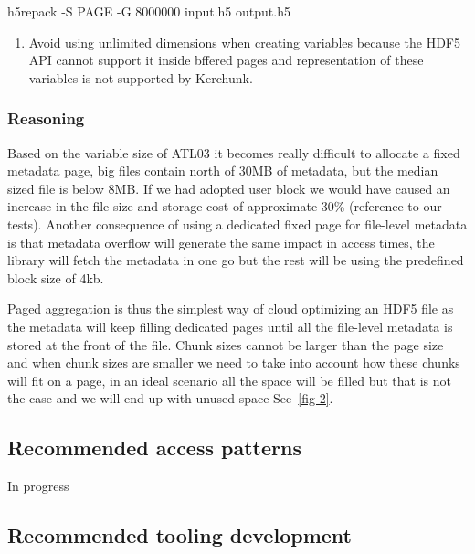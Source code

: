 \documentclass[
]{agujournal2019}
\newenvironment{Shaded}{\begin{snugshade}}{\end{snugshade}}
\newcommand{\AttributeTok}[1]{\textcolor[rgb]{0.40,0.45,0.13}{#1}}
\newcommand{\ExtensionTok}[1]{\textcolor[rgb]{0.00,0.23,0.31}{#1}}
\newcommand{\NormalTok}[1]{\textcolor[rgb]{0.00,0.23,0.31}{#1}}
\providecommand{\tightlist}{%
  \setlength{\itemsep}{0pt}\setlength{\parskip}{0pt}}\usepackage{longtable,booktabs,array}
\begin{document}
\begin{Shaded}
\begin{Highlighting}[]
 \ExtensionTok{h5repack} \AttributeTok{{-}S}\NormalTok{ PAGE }\AttributeTok{{-}G}\NormalTok{ 8000000 input.h5 output.h5}
\end{Highlighting}
\end{Shaded}

\begin{enumerate}
\def\labelenumi{\arabic{enumi}.}
\setcounter{enumi}{2}
\tightlist
\item
  Avoid using unlimited dimensions when creating variables because the
  HDF5 API cannot support it inside bffered pages and representation of
  these variables is not supported by Kerchunk.
\end{enumerate}

\subsubsection{Reasoning}\label{reasoning}

Based on the variable size of ATL03 it becomes really difficult to
allocate a fixed metadata page, big files contain north of 30MB of
metadata, but the median sized file is below 8MB. If we had adopted user
block we would have caused an increase in the file size and storage cost
of approximate 30\% (reference to our tests). Another consequence of
using a dedicated fixed page for file-level metadata is that metadata
overflow will generate the same impact in access times, the library will
fetch the metadata in one go but the rest will be using the predefined
block size of 4kb.

Paged aggregation is thus the simplest way of cloud optimizing an HDF5
file as the metadata will keep filling dedicated pages until all the
file-level metadata is stored at the front of the file. Chunk sizes
cannot be larger than the page size and when chunk sizes are smaller we
need to take into account how these chunks will fit on a page, in an
ideal scenario all the space will be filled but that is not the case and
we will end up with unused space See~\ref{fig-2}.

\subsection{Recommended access
patterns}\label{recommended-access-patterns}

In progress

\subsection{Recommended tooling
development}\label{recommended-tooling-development}
\end{document}
